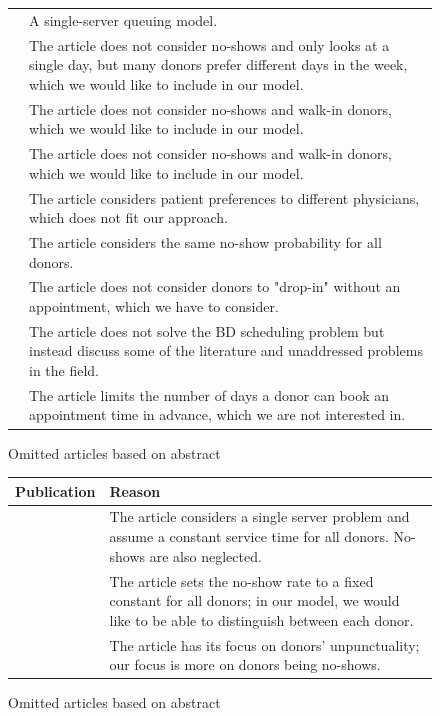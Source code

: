 \documentclass[a4paper,12pt]{article}
\begin{document}
\begin{figure}[H]
\begin{table}[H]
\begin{tabularx}{\textwidth}{@{} c Y @{}}
    \cite{BD11}        &    A single-server queuing model. \\
    \cite{BD16}        &    The article does not consider no-shows and only looks at a single day,  but many donors prefer different days in the week, which we would like to include in our model.  \\
    \cite{BD17}        &    The article does not consider no-shows and walk-in donors, which we would like to include in our model.  \\
    \cite{BD21}        &    The article does not consider no-shows and walk-in donors, which we would like to include in our model.\\
    \cite{BD22}        &    The article considers patient preferences to different physicians, which does not fit our approach. \\
    \cite{BD24}        &    The article considers the same no-show probability for all donors. \\
    \cite{BD28}        &    The article does not consider donors to "drop-in" without an appointment, which we have to consider. \\
    
    \cite{BD33}        &    The article does not solve the BD scheduling problem but instead discuss some of the literature and unaddressed problems in the field. \\ 
    \cite{BD34}        &    The article limits the number of days a donor can book an appointment time in advance, which we are not interested in. \\
    \bottomrule
    \end{tabularx}
    \end{table}

    \caption{Omitted articles based on abstract}
    \label{bad}
\end{figure}

\begin{figure}[H]
\ContinuedFloat
    \centering

    \begin{table}[H]
    \begin{tabularx}{\textwidth}{@{} c Y @{}}
    \toprule
    Publication & Reason \\ \midrule
    \cite{BD35}        &    The article considers a single server problem and assume a constant service time for all donors. No-shows are also neglected. \\
    \cite{BD37}        &    The article sets the no-show rate to a fixed constant for all donors; in our model, we would like to be able to distinguish between each donor. \\
    \cite{BD46}        &    The article has its focus on donors' unpunctuality; our focus is more on donors being no-shows.  \\
    \bottomrule
    \end{tabularx}
    \end{table}

    \caption{Omitted articles based on abstract}
    \label{bad}
\end{figure}
\end{document}
